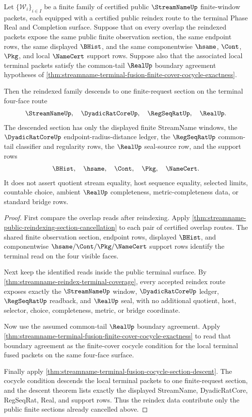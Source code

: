 \begin{theorem}
\label{thm:streamname-reindex-finite-cover-terminal-descent}
Let $\{\mathcal W_i\}_{i\in I}$ be a finite family of certified public
$\StreamNameUp$ finite-window packets, each equipped with a certified public
reindex route to the terminal Phase Real and Completion surface. Suppose that
on every overlap the reindexed packets expose the same public finite
observation section, the same endpoint rows, the same displayed $\BHist$, and
the same componentwise $\hsame$, $\Cont$, $\Pkg$, and local $\NameCert$
support rows. Suppose also that the associated local terminal packets satisfy
the common-tail $\RealUp$ boundary agreement hypotheses of
\autoref{thm:streamname-terminal-fusion-finite-cover-cocycle-exactness}.

Then the reindexed family descends to one finite-request section on the
terminal four-face route
$$
\StreamNameUp,\quad \DyadicRatCoreUp,\quad \RegSeqRatUp,\quad \RealUp.
$$
The descended section has only the displayed finite StreamName windows, the
$\DyadicRatCoreUp$ endpoint-radius-distance ledger, the $\RegSeqRatUp$
common-tail classifier and regularity rows, the $\RealUp$ seal-source row, and
the support rows
$$
\BHist,\quad \hsame,\quad \Cont,\quad \Pkg,\quad \NameCert.
$$
It does not assert quotient stream equality, host sequence equality, selected
limits, countable choice, ambient $\RealUp$ completeness,
metric-completeness data, or standard bridge rows.
\end{theorem}
\begin{proof}
First compare the overlap reads after reindexing. Apply
\autoref{thm:streamname-public-reindexing-section-cancellation} to each pair
of certified overlap routes. The shared finite observation section, endpoint
rows, displayed $\BHist$, and componentwise $\hsame/\Cont/\Pkg/\NameCert$
support rows identify the terminal read on the four visible faces.

Next keep the identified reads inside the public terminal surface. By
\autoref{thm:streamname-reindex-terminal-coverage}, every accepted reindex
route exposes exactly the $\StreamNameUp$ window, $\DyadicRatCoreUp$ ledger,
$\RegSeqRatUp$ readback, and $\RealUp$ seal, with no additional quotient,
host, selector, choice, completeness, metric, or bridge coordinate.

Now use the assumed common-tail $\RealUp$ boundary agreement. Apply
\autoref{thm:streamname-terminal-fusion-finite-cover-cocycle-exactness} to
read that boundary agreement as the finite-cover cocycle condition for the
local terminal fused packets on the same four-face surface.

Finally apply
\autoref{thm:streamname-terminal-fusion-cocycle-section-descent}. The cocycle
condition descends the local terminal packets to one finite-request section,
and the descent theorem lists exactly the displayed StreamName, DyadicRatCore,
RegSeqRat, Real, and support rows. Thus the reindex data contribute only the
public finite sections already cancelled above.
\end{proof}

